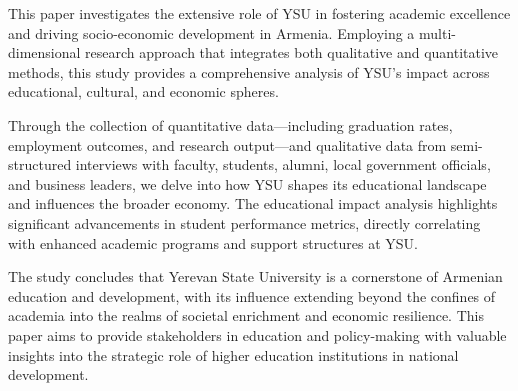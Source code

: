 \setmainfont{DejaVu Sans}
\fontsize{12}{12}\selectfont


\vspace{0.6cm}

This paper investigates the extensive role of YSU in fostering academic excellence and driving socio-economic development in Armenia. Employing a multi-dimensional research approach that integrates both qualitative and quantitative methods, this study provides a comprehensive analysis of YSU’s impact across educational, cultural, and economic spheres.

Through the collection of quantitative data—including graduation rates, employment outcomes, and research output—and qualitative data from semi-structured interviews with faculty, students, alumni, local government officials, and business leaders, we delve into how YSU shapes its educational landscape and influences the broader economy. The educational impact analysis highlights significant advancements in student performance metrics, directly correlating with enhanced academic programs and support structures at YSU.

The study concludes that Yerevan State University is a cornerstone of Armenian education and development, with its influence extending beyond the confines of academia into the realms of societal enrichment and economic resilience. This paper aims to provide stakeholders in education and policy-making with valuable insights into the strategic role of higher education institutions in national development.

\thispagestyle{empty}
\pagebreak
